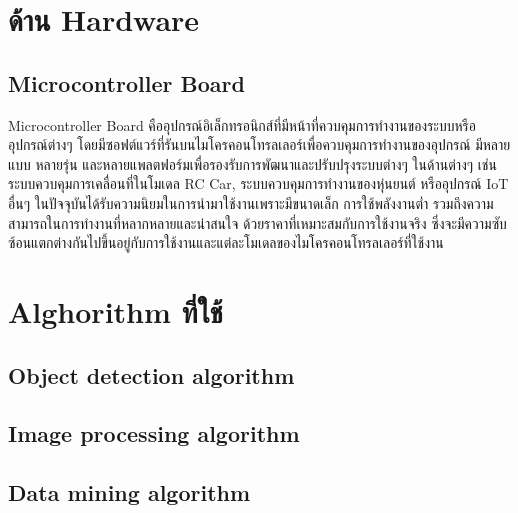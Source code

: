 \section{ด้าน Hardware}

\subsection{Microcontroller Board}
Microcontroller Board คืออุปกรณ์อิเล็กทรอนิกส์ที่มีหน้าที่ควบคุมการทำงานของระบบหรืออุปกรณ์ต่างๆ โดยมีซอฟต์แวร์ที่รันบนไมโครคอนโทรลเลอร์เพื่อควบคุมการทำงานของอุปกรณ์ มีหลายแบบ หลายรุ่น และหลายแพลตฟอร์มเพื่อรองรับการพัฒนาและปรับปรุงระบบต่างๆ ในด้านต่างๆ เช่น ระบบควบคุมการเคลื่อนที่ในโมเดล RC Car, 
ระบบควบคุมการทำงานของหุ่นยนต์ หรืออุปกรณ์ IoT อื่นๆ ในปัจจุบันได้รับความนิยมในการนำมาใช้งานเพราะมีขนาดเล็ก การใช้พลังงานต่ำ รวมถึงความสามารถในการทำงานที่หลากหลายและน่าสนใจ ด้วยราคาที่เหมาะสมกับการใช้งานจริง ซึ่งจะมีความซับซ้อนแตกต่างกันไปขึ้นอยู่กับการใช้งานและแต่ละโมเดลของไมโครคอนโทรลเลอร์ที่ใช้งาน\cite{Micro}

\section{Alghorithm ที่ใช้}

\subsection{Object detection algorithm}

\subsection{Image processing algorithm}

\subsection{Data mining algorithm}






